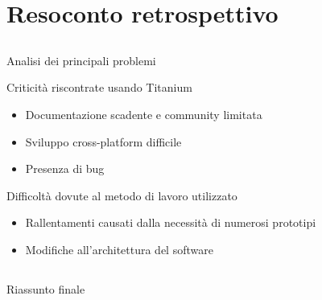 \section{Resoconto retrospettivo}
	\subsection{}
		\begin{frame}{Analisi dei principali problemi}
			\begin{block}{Criticità riscontrate usando Titanium}
				\begin{itemize}
					\item Documentazione scadente e community limitata
					\item Sviluppo cross-platform difficile
					\item Presenza di bug
				\end{itemize}
			\end{block}
			\begin{block}{Difficoltà dovute al metodo di lavoro utilizzato}
				\begin{itemize}
					\item Rallentamenti causati dalla necessità di numerosi prototipi
					\item Modifiche all'architettura del software
				\end{itemize}
			\end{block}
		\end{frame}
	\subsection{}
		\begin{frame}{Riassunto finale}
		\end{frame}
